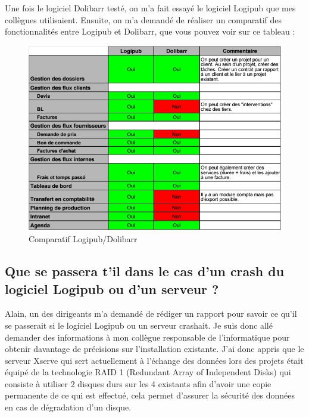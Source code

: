 \documentclass[report]{tnreport}
\begin{document}
Une fois le logiciel Dolibarr testé, on m’a fait essayé le logiciel Logipub que mes collègues utilisaient. Ensuite, on m’a demandé de réaliser un comparatif des fonctionnalités entre Logipub et Dolibarr, que vous pouvez voir sur ce tableau :
\begin{figure}[h]
  \centering
  \includegraphics[width=13cm]{figures/dolibarrVSlogipub}
  \caption{Comparatif Logipub/Dolibarr}
  
  \label{fig:comparatif}
\end{figure}


\subsection{Que se passera t’il dans le cas d’un crash du logiciel Logipub ou d’un serveur ?}

Alain, un des dirigeants m’a demandé de rédiger un rapport pour savoir ce qu’il se passerait si le logiciel Logipub ou un serveur crashait. Je suis donc allé demander des informations à mon collègue responsable de l’informatique pour obtenir davantage de précisions sur l’installation existante. J’ai donc appris que le serveur Xserve qui sert actuellement à l’échange des données lors des projets était équipé de la technologie RAID 1 (Redundant Array of Independent Disks) qui consiste à utiliser 2 disques durs sur les 4 existants afin d’avoir une copie permanente de ce qui est effectué, cela permet d’assurer la sécurité des données en cas de dégradation d’un disque.
\end{document}
